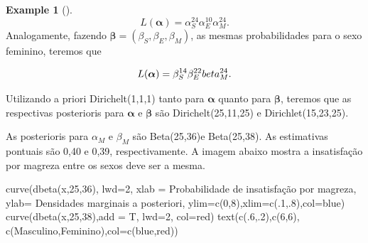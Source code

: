 \documentclass[
  letterpaper,
  DIV=11,
  numbers=noendperiod]{scrreprt}
\newenvironment{Shaded}{\begin{snugshade}}{\end{snugshade}}
\newcommand{\AttributeTok}[1]{\textcolor[rgb]{0.40,0.45,0.13}{#1}}
\newcommand{\DecValTok}[1]{\textcolor[rgb]{0.68,0.00,0.00}{#1}}
\newcommand{\FunctionTok}[1]{\textcolor[rgb]{0.28,0.35,0.67}{#1}}
\newcommand{\NormalTok}[1]{\textcolor[rgb]{0.00,0.23,0.31}{#1}}
\newcommand{\StringTok}[1]{\textcolor[rgb]{0.13,0.47,0.30}{#1}}
\theoremstyle{plain}
\theoremstyle{definition}
\newtheorem{example}{Example}[chapter]
\theoremstyle{definition}
\theoremstyle{remark}
\begin{document}
\begin{example}[]
\[L(\boldsymbol{\alpha})=\alpha_S^{24}\alpha_E^{10}\alpha_M^{24}.\]
Analogamente, fazendo \(\boldsymbol{\beta}=(\beta_S,\beta_E,\beta_M)\),
as mesmas probabilidades para o sexo feminino, teremos que

\[L(\boldsymbol{\alpha})=\beta_S^{14}\beta_E^{22}\\beta_M^{24}.\]

Utilizando a priori Dirichelt(1,1,1) tanto para \(\boldsymbol{\alpha}\)
quanto para \(\boldsymbol{\beta}\), teremos que as respectivas
posterioris para \(\boldsymbol{\alpha}\) e \(\boldsymbol{\beta}\) são
Dirichelt(25,11,25) e Dirichlet(15,23,25).

As posterioris para \(\alpha_M\) e \(\beta_M\) são Beta(25,36)e
Beta(25,38). As estimativas pontuais são 0,40 e 0,39, respectivamente. A
imagem abaixo mostra a insatisfação por magreza entre os sexos deve ser
a mesma.

\begin{Shaded}
\begin{Highlighting}[]
\FunctionTok{curve}\NormalTok{(}\FunctionTok{dbeta}\NormalTok{(x,}\DecValTok{25}\NormalTok{,}\DecValTok{36}\NormalTok{), }\AttributeTok{lwd=}\DecValTok{2}\NormalTok{, }\AttributeTok{xlab =} \StringTok{\textquotesingle{}Probabilidade de insatisfação por magreza\textquotesingle{}}\NormalTok{, }\AttributeTok{ylab=} \StringTok{\textquotesingle{}Densidades marginais a posteriori\textquotesingle{}}\NormalTok{, }\AttributeTok{ylim=}\FunctionTok{c}\NormalTok{(}\DecValTok{0}\NormalTok{,}\DecValTok{8}\NormalTok{),}\AttributeTok{xlim=}\FunctionTok{c}\NormalTok{(.}\DecValTok{1}\NormalTok{,.}\DecValTok{8}\NormalTok{),}\AttributeTok{col=}\StringTok{\textquotesingle{}blue\textquotesingle{}}\NormalTok{)}
\FunctionTok{curve}\NormalTok{(}\FunctionTok{dbeta}\NormalTok{(x,}\DecValTok{25}\NormalTok{,}\DecValTok{38}\NormalTok{),}\AttributeTok{add =}\NormalTok{ T, }\AttributeTok{lwd=}\DecValTok{2}\NormalTok{, }\AttributeTok{col=}\StringTok{\textquotesingle{}red\textquotesingle{}}\NormalTok{)}
\FunctionTok{text}\NormalTok{(}\FunctionTok{c}\NormalTok{(.}\DecValTok{6}\NormalTok{,.}\DecValTok{2}\NormalTok{),}\FunctionTok{c}\NormalTok{(}\DecValTok{6}\NormalTok{,}\DecValTok{6}\NormalTok{), }\FunctionTok{c}\NormalTok{(}\StringTok{\textquotesingle{}Masculino\textquotesingle{}}\NormalTok{,}\StringTok{\textquotesingle{}Feminino\textquotesingle{}}\NormalTok{),}\AttributeTok{col=}\FunctionTok{c}\NormalTok{(}\StringTok{\textquotesingle{}blue\textquotesingle{}}\NormalTok{,}\StringTok{\textquotesingle{}red\textquotesingle{}}\NormalTok{))}
\end{Highlighting}
\end{Shaded}


\end{example}
\end{document}

